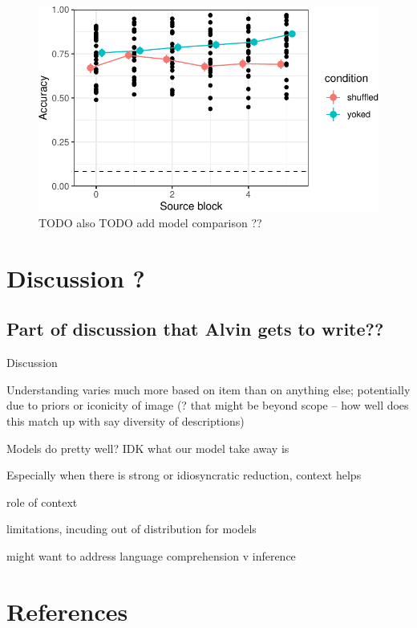 \documentclass[10pt, letterpaper]{article}
\begin{document}
\begin{CodeChunk}
\begin{figure}[t]

{\centering \includegraphics[width=1\linewidth]{figs/fig-n-1} 

}

\caption[TODO also TODO add model comparison ?? \label{yoked}]{TODO also TODO add model comparison ?? \label{yoked}}\label{fig:fig-n}
\end{figure}
\end{CodeChunk}

\section{Discussion ?}\label{discussion}

\subsection{Part of discussion that Alvin gets to
write??}\label{part-of-discussion-that-alvin-gets-to-write}

Discussion

Understanding varies much more based on item than on anything else;
potentially due to priors or iconicity of image (? that might be beyond
scope -- how well does this match up with say diversity of descriptions)

Models do pretty well? IDK what our model take away is

Especially when there is strong or idiosyncratic reduction, context
helps

role of context

limitations, incuding out of distribution for models

might want to address language comprehension v inference

\section{References}\label{references}

\setlength{\parindent}{-0.1in} 
\setlength{\leftskip}{0.125in}

\noindent


\end{document}
